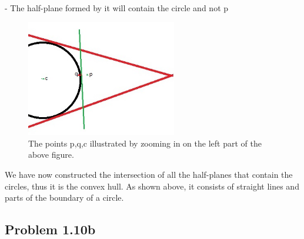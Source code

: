 \documentclass[11pt,psfig]{article}
\begin{document}
\\					- The half-plane formed by it will contain the circle and not p
\begin{figure}[H]
\centering
\includegraphics[height=2in]{hw1prob1-10a_2.jpg}
\caption{The points p,q,c illustrated by zooming in on the left part of the above figure.}
\end{figure}
We have now constructed the intersection of all the half-planes that contain the circles, thus it is the convex hull. As shown above, it consists of straight lines and parts of the boundary of a circle. 

\subsection*{Problem 1.10b}
\end{document}

